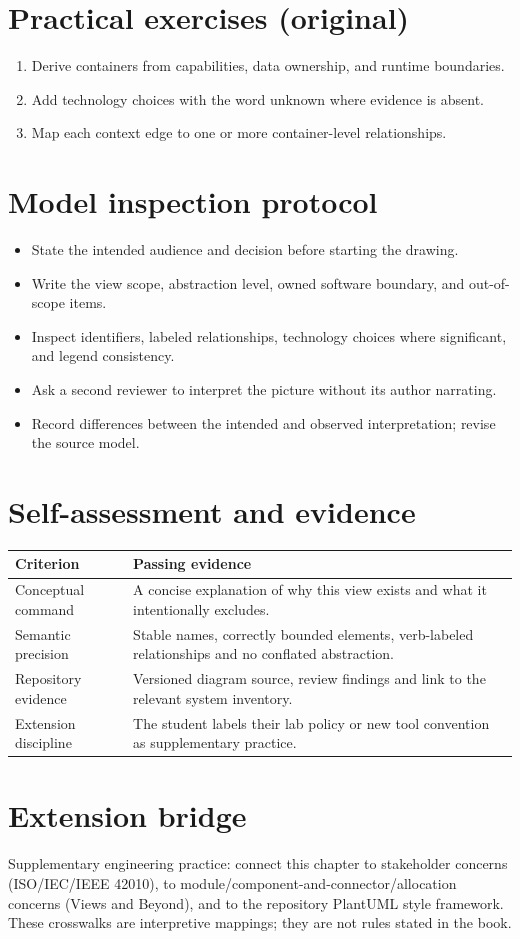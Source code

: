 \documentclass[10pt,letterpaper]{article}
\begin{document}
\section{Practical exercises (original)}
\begin{enumerate}
\item Derive containers from capabilities, data ownership, and runtime boundaries.
\item Add technology choices with the word unknown where evidence is absent.
\item Map each context edge to one or more container-level relationships.
\end{enumerate}

\section{Model inspection protocol}
\begin{itemize}
\item State the intended audience and decision before starting the drawing.
\item Write the view scope, abstraction level, owned software boundary, and out-of-scope items.
\item Inspect identifiers, labeled relationships, technology choices where significant, and legend consistency.
\item Ask a second reviewer to interpret the picture without its author narrating.
\item Record differences between the intended and observed interpretation; revise the source model.
\end{itemize}

\section{Self-assessment and evidence}
\begin{tabularx}{\linewidth}{@{}YY@{}}\toprule
\textbf{Criterion} & \textbf{Passing evidence} \\ \midrule
Conceptual command & A concise explanation of why this view exists and what it intentionally excludes. \\
Semantic precision & Stable names, correctly bounded elements, verb-labeled relationships and no conflated abstraction. \\
Repository evidence & Versioned diagram source, review findings and link to the relevant system inventory. \\
Extension discipline & The student labels their lab policy or new tool convention as supplementary practice. \\
\bottomrule\end{tabularx}


\section{Extension bridge}
Supplementary engineering practice: connect this chapter to stakeholder concerns (ISO/IEC/IEEE 42010), to module/component-and-connector/allocation concerns (Views and Beyond), and to the repository PlantUML style framework. These crosswalks are interpretive mappings; they are not rules stated in the book.
\end{document}
